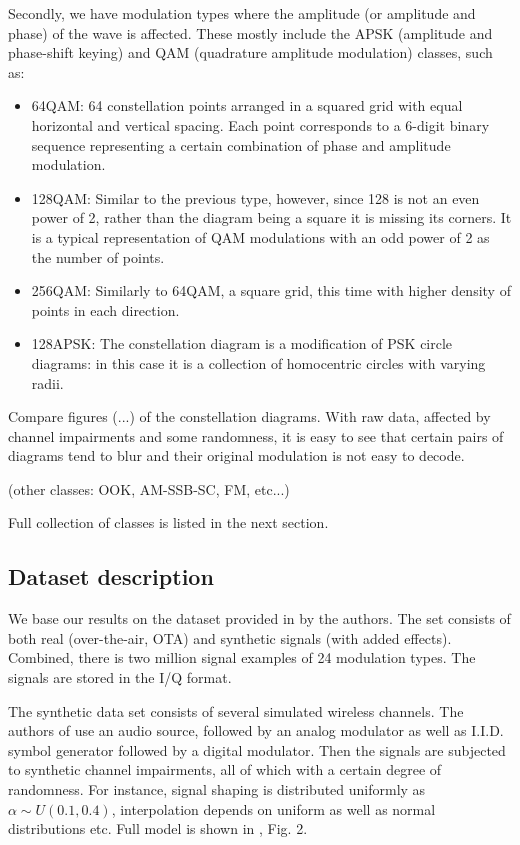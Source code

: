 \documentclass[12pt]{article}
\theoremstyle{plain}
\theoremstyle{definition}
\theoremstyle{remark}
\begin{document}
Secondly, we have modulation types where the amplitude (or amplitude and phase) of the wave is affected. These mostly include the APSK (amplitude and phase-shift keying) and QAM (quadrature amplitude modulation) classes, such as:
\begin{itemize}
	\item 64QAM: 64 constellation points arranged in a squared grid with equal horizontal and vertical spacing. Each point corresponds to a 6-digit binary sequence representing a certain combination of phase and amplitude modulation.
	\item 128QAM: Similar to the previous type, however, since 128 is not an even power of 2, rather than the diagram being a square it is missing its corners. It is a typical representation of QAM modulations with an odd power of 2 as the number of points.
	\item 256QAM: Similarly to 64QAM, a square grid, this time with higher density of points in each direction.
	\item 128APSK: The constellation diagram is a modification of PSK circle diagrams: in this case it is a collection of homocentric circles with varying radii.
\end{itemize}
Compare figures (...) of the constellation diagrams. With raw data, affected by channel impairments and some randomness, it is easy to see that certain pairs of diagrams tend to blur and their original modulation is not easy to decode.


(other classes: OOK, AM-SSB-SC, FM, etc...)

	Full collection of classes is listed in the next section.
	

	
	\subsection{Dataset description}
	
	We base our results on the dataset provided in \cite{ORC} by the authors. The set consists of both real (over-the-air, OTA) and synthetic signals (with added effects). Combined, there is two million signal examples of 24 modulation types. The signals are stored in the I/Q format.
	
	The synthetic data set consists of several simulated wireless channels. The authors of \cite{ORC} use an audio source, followed by an analog modulator as well as I.I.D. symbol generator followed by a digital modulator. Then the signals are subjected to synthetic channel impairments, all of which with a certain degree of randomness. For instance, signal shaping is distributed uniformly as $\alpha \sim U(0.1, 0.4)$, interpolation depends on uniform as well as normal distributions etc. Full model is shown in \cite{ORC}, Fig. 2.
	
\end{document}
